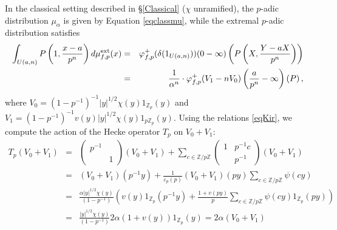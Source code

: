 \documentclass{amsart}
\newcommand{\Z}{{\mathbb Z}}
\begin{document}
In the classical setting described in \S \ref{Classical} ($\chi$ unramified), the $p$-adic distribution $\mu_\alpha$ is given by Equation \eqref{eqclassmu}, while the extremal $p$-adic distribution satisfies
\begin{eqnarray*}
\int_{U(a,n)}P\left(1,\frac{x-a}{p^n}\right)d\mu^{\rm ext}_{f,p}(x)&=&\varphi_{f,p}^+(\delta(1_{U(a,n)}))(0-\infty)\left(P\left(X,\frac{Y-aX}{p^n}\right)\right)\\
&=&\frac{1}{\alpha^n}\cdot\varphi^+_{f,p}(V_1-nV_0)\left(\frac{a}{p^n}-\infty\right)\left(P\right),%
\end{eqnarray*}
where $V_0=(1-p^{-1})^{-1}|y|^{1/2}\chi(y)1_{\Z_p}(y)$ and $V_1=(1-p^{-1})^{-1}v(y)|y|^{1/2}\chi(y)1_{p\Z_p}(y)$. Using the relations \eqref{eqKir}, we  compute the action of the Hecke operator $T_p$ on $V_0+V_1$:
\begin{eqnarray*}
T_p (V_0+V_1)&=&\left(\begin{array}{cc}p^{-1}&\\&1\end{array}\right)(V_0+V_1)+\sum_{c\in\Z/p\Z}\left(\begin{array}{cc}1&p^{-1}c\\&p^{-1}\end{array}\right)(V_0+V_1)\\
&=&(V_0+V_1)(p^{-1}y)+\frac{1}{\varepsilon_p(p)}(V_0+V_1)(py)\sum_{c\in\Z/p\Z}\psi(cy)\\
&=&\frac{\alpha|y|^{1/2}\chi(y)}{(1-p^{-1})}\left(v(y)1_{\Z_p}(p^{-1}y)+\frac{1+v(py)}{p}\sum_{c\in\Z/p\Z}\psi(cy)1_{\Z_p}(py)\right)\\
&=&\frac{|y|^{1/2}\chi(y)}{(1-p^{-1})}2\alpha\left(1+v(y)\right)1_{\Z_p}(y)=2\alpha(V_0+V_1)
\end{eqnarray*}
\end{document}
